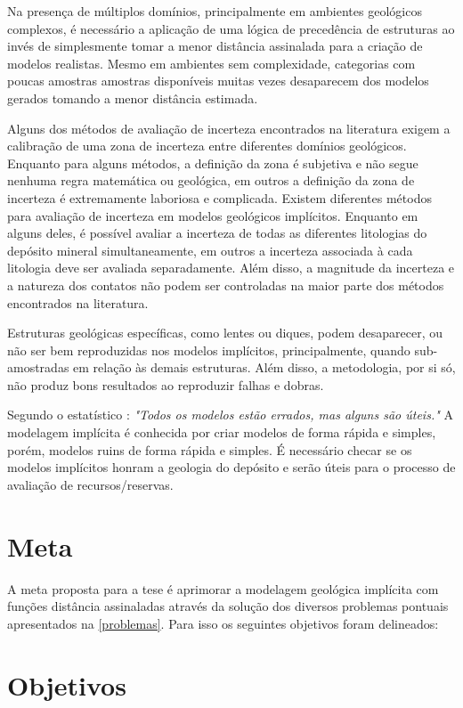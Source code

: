 Na presença de múltiplos domínios, principalmente em ambientes geológicos complexos, é necessário a aplicação de uma lógica de precedência de estruturas ao invés de simplesmente tomar a menor distância assinalada para a criação de modelos realistas. Mesmo em ambientes sem complexidade, categorias com poucas amostras amostras disponíveis muitas vezes desaparecem dos modelos gerados tomando a menor distância estimada.

Alguns dos métodos de avaliação de incerteza encontrados na literatura exigem a calibração de uma zona de incerteza entre diferentes domínios geológicos. Enquanto para alguns métodos, a definição da zona é subjetiva e não segue nenhuma regra matemática ou geológica, em outros a definição da zona de incerteza é extremamente laboriosa e complicada.
Existem diferentes métodos para avaliação de incerteza em modelos geológicos implícitos. Enquanto em alguns deles, é possível avaliar a incerteza de todas as diferentes litologias do depósito mineral simultaneamente, em outros a incerteza associada à cada litologia deve ser avaliada separadamente. Além disso, a magnitude da incerteza e a natureza dos contatos não podem ser controladas na maior parte dos métodos encontrados na literatura.

Estruturas geológicas específicas, como lentes ou diques, podem desaparecer, ou não ser bem reproduzidas nos modelos implícitos, principalmente, quando sub-amostradas em relação às demais estruturas. Além disso, a metodologia, por si só, não produz bons resultados ao reproduzir falhas e dobras. 

Segundo o estatístico : \textit{"Todos os modelos estão errados, mas alguns são úteis."} A modelagem implícita é conhecida por criar modelos de forma rápida e simples, porém, modelos ruins de forma rápida e simples. É necessário checar se os modelos implícitos honram a geologia do depósito e serão úteis para o processo de avaliação de recursos/reservas. 

\section{Meta}

A meta proposta para a tese é aprimorar a modelagem geológica implícita com funções distância assinaladas através da solução dos diversos problemas pontuais apresentados na \autoref{problemas}. Para isso os seguintes objetivos foram delineados:

\section{Objetivos}

